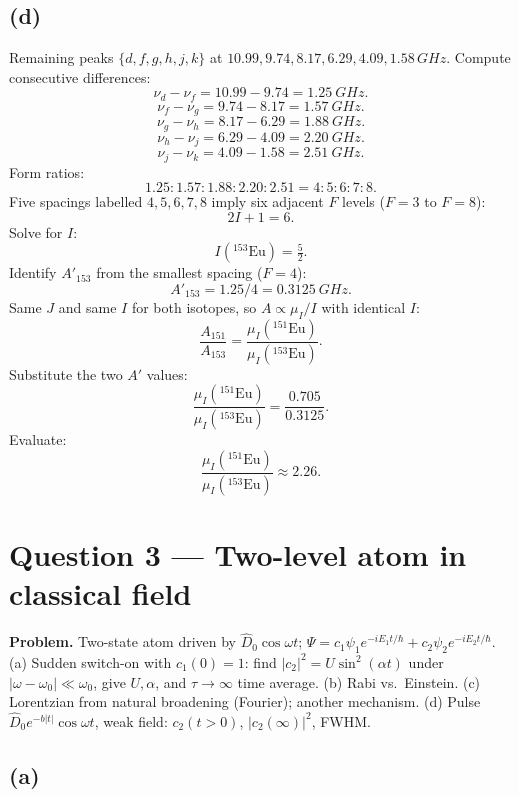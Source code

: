 \documentclass[11pt]{article}
\begin{document}
\subsection*{(d)}

Remaining peaks $\{d,f,g,h,j,k\}$ at $10.99,9.74,8.17,6.29,4.09,1.58\,\si{GHz}$. Compute consecutive differences:
\[ \nu_d-\nu_f=10.99-9.74=\SI{1.25}{GHz}. \]
\[ \nu_f-\nu_g=9.74-8.17=\SI{1.57}{GHz}. \]
\[ \nu_g-\nu_h=8.17-6.29=\SI{1.88}{GHz}. \]
\[ \nu_h-\nu_j=6.29-4.09=\SI{2.20}{GHz}. \]
\[ \nu_j-\nu_k=4.09-1.58=\SI{2.51}{GHz}. \]
Form ratios:
\[ 1.25:1.57:1.88:2.20:2.51=4:5:6:7:8. \]
Five spacings labelled $4,5,6,7,8$ imply six adjacent $F$ levels ($F=3$ to $F=8$):
\[ 2I+1=6. \]
Solve for $I$:
\[ \boxed{\;I({}^{153}\text{Eu})=\tfrac{5}{2}.\;} \]
Identify $A'_{153}$ from the smallest spacing ($F=4$):
\[ A'_{153}=1.25/4=\SI{0.3125}{GHz}. \]
Same $J$ and same $I$ for both isotopes, so $A\propto \mu_I/I$ with identical $I$:
\[ \frac{A_{151}}{A_{153}}=\frac{\mu_I({}^{151}\text{Eu})}{\mu_I({}^{153}\text{Eu})}. \]
Substitute the two $A'$ values:
\[ \frac{\mu_I({}^{151}\text{Eu})}{\mu_I({}^{153}\text{Eu})}=\frac{0.705}{0.3125}. \]
Evaluate:
\[ \boxed{\;\frac{\mu_I({}^{151}\text{Eu})}{\mu_I({}^{153}\text{Eu})}\approx 2.26.\;} \]

\section*{Question 3 --- Two-level atom in classical field}

\textbf{Problem.} Two-state atom driven by $\hat D_0\cos\omega t$; $\Psi=c_1\psi_1 e^{-iE_1 t/\hbar}+c_2\psi_2 e^{-iE_2 t/\hbar}$. (a) Sudden switch-on with $c_1(0)=1$: find $|c_2|^2=U\sin^2(\alpha t)$ under $|\omega-\omega_0|\ll\omega_0$, give $U,\alpha$, and $\tau\to\infty$ time average. (b) Rabi vs.\ Einstein. (c) Lorentzian from natural broadening (Fourier); another mechanism. (d) Pulse $\hat D_0 e^{-b|t|}\cos\omega t$, weak field: $c_2(t>0)$, $|c_2(\infty)|^2$, FWHM.

\subsection*{(a)}
\end{document}
